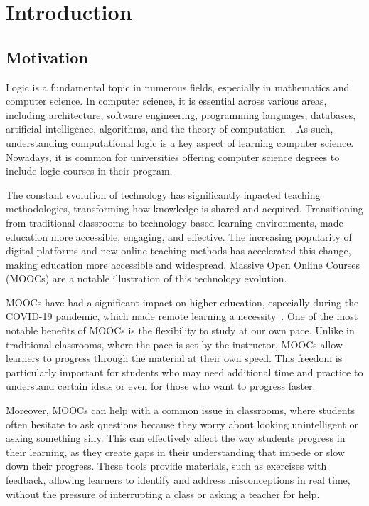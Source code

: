 
%

\chapter{Introduction}

\section{Motivation}
Logic is a fundamental topic in numerous fields, especially in mathematics and computer science. In computer science, it is essential across various areas, including architecture, software engineering, programming languages, databases, artificial intelligence, algorithms, and the theory of computation~\cite{bruce_panel}. As such, understanding computational logic is a key aspect of learning computer science. Nowadays, it is common for universities offering computer science degrees to include logic courses in their program.

The constant evolution of technology has significantly inpacted teaching methodologies, transforming how knowledge is shared and acquired. Transitioning from traditional classrooms to technology-based learning environments, made education more accessible, engaging, and effective. The increasing popularity of digital platforms and new online teaching methods has accelerated this change, making education more accessible and widespread. Massive Open Online Courses (MOOCs) are a notable illustration of this technology evolution.

MOOCs have had a significant impact on higher education, especially during the COVID-19 pandemic, which made remote learning a necessity~\cite{alhazzani_2020_moocs}. One of the most notable benefits of MOOCs is the flexibility to study at our own pace. Unlike in traditional classrooms, where the pace is set by the instructor, MOOCs allow learners to progress through the material at their own speed. This freedom is particularly important for students who may need additional time and practice to understand certain ideas or even for those who want to progress faster.

Moreover, MOOCs can help with a common issue in classrooms, where students often hesitate to ask questions because they worry about looking unintelligent or asking something silly. This can effectively affect the way students progress in their learning, as they create gaps in their understanding that impede or slow down their progress. These tools provide materials, such as exercises with feedback, allowing learners to identify and address misconceptions in real time, without the pressure of interrupting a class or asking a teacher for help.

